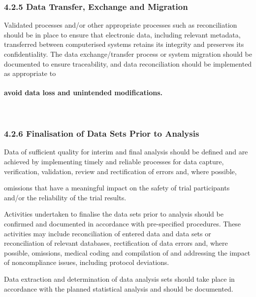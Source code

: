 \documentclass[11pt]{article}
\begin{document}
\subsubsection{4.2.5 Data Transfer, Exchange and Migration}

Validated processes and/or other appropriate processes such as reconciliation should be in place to ensure that electronic data, including relevant metadata, transferred between computerised systems retains its integrity and preserves its confidentiality. The data exchange/transfer process or system migration should be documented to ensure traceability, and data reconciliation should be implemented as appropriate to


\paragraph{avoid data loss and unintended modifications.}\mbox{}\\

\subsubsection{4.2.6 Finalisation of Data Sets Prior to Analysis}

\begin{description}[leftmargin=2.5cm,style=sameline]

\item[(a)] Data of sufficient quality for interim and final analysis should be defined and are achieved by implementing timely and reliable processes for data capture, verification, validation, review and rectification of errors and, where possible,

\end{description}

omissions that have a meaningful impact on the safety of trial participants and/or the reliability of the trial results.


\begin{description}[leftmargin=2.5cm,style=sameline]

\item[(b)] Activities undertaken to finalise the data sets prior to analysis should be confirmed and documented in accordance with pre-specified procedures. These activities may include reconciliation of entered data and data sets or reconciliation of relevant databases, rectification of data errors and, where possible, omissions, medical coding and compilation of and addressing the impact of noncompliance issues, including protocol deviations.

\item[(c)] Data extraction and determination of data analysis sets should take place in accordance with the planned statistical analysis and should be documented.

\end{description}
\end{document}
